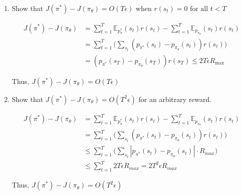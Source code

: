 \documentclass{article}%
\begin{document}
\begin{enumerate}[label=(\alph*)]
	\item Show that $J(\pi^*) - J(\pi_\theta)=O(T\epsilon)$ when $r(s_t) = 0 \text{ for all } t < T$
	
	\begin{align*}
		J(\pi^*) - J(\pi_\theta) &= \sum_{t=1}^{T} \mathbb{E}_{p^*_\pi}(s_t)r(s_t) - \sum_{t=1}^{T} \mathbb{E}_{p_{\pi_\theta}}(s_t)r(s_t) \\
		&= \sum_{t=1}^{T} \Big(\sum_{s_t}(p_{\pi^*}(s_t) - p_{\pi_\theta}(s_t))r(s_t)\Big) \\
		&=(p_{\pi^*}(s_T) - p_{\pi_\theta}(s_T))r(s_T) \leq 2T\epsilon R_{\max} 
	\end{align*}
	
	Thus, $J(\pi^*) - J(\pi_\theta)=O(T\epsilon)$
	
	\item Show that $J(\pi^*) - J(\pi_\theta)=O(T^2 \epsilon)$ for an arbitrary reward.
	
	\begin{align*}
		J(\pi^*) - J(\pi_\theta) &= \sum_{t=1}^{T} \mathbb{E}_{p^*_\pi}(s_t)r(s_t) - \sum_{t=1}^{T} \mathbb{E}_{p_{\pi_\theta}}(s_t)r(s_t) \\
		&= \sum_{t=1}^{T} \Big(\sum_{s_t}(p_{\pi^*}(s_t) - p_{\pi_\theta}(s_t))r(s_t)\Big) \\
		& \leq \sum_{t=1}^{T} \Big(\sum_{s_t} | p_{\pi^*}(s_t) - p_{\pi_\theta}(s_t) | \cdot R_{max} \Big) \\
		& \leq \sum_{t=1}^{T} 2T\epsilon R_{max} = 2T^2 \epsilon R_{max}
	\end{align*}

	Thus, $J(\pi^*) - J(\pi_\theta)=O(T^2 \epsilon)$
\end{enumerate}
\end{document}
